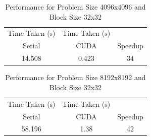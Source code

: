 \documentclass[12pt]{article}
\begin{document}
\begin{table}[h]
\centering
\caption{Performance for Problem Size 4096x4096 and Block Size 32x32}
\label{tab:3}
\begin{tabular}{@{} ccc @{}}
\toprule
Time Taken (s) & Time Taken (s) & \\
Serial & CUDA & Speedup\\
\midrule
14.508 & 0.423 & 34 \\
\bottomrule
\end{tabular}
\end{table}

\begin{table}[htbp]
\centering
\caption{Performance for Problem Size 8192x8192 and Block Size 32x32}
\label{tab:4}
\begin{tabular}{@{} ccc @{}}
\toprule
Time Taken (s) & Time Taken (s) & \\
Serial & CUDA & Speedup\\
\midrule
58.196 & 1.38 & 42 \\
\bottomrule
\end{tabular}
\end{table}




\clearpage
\end{document}
